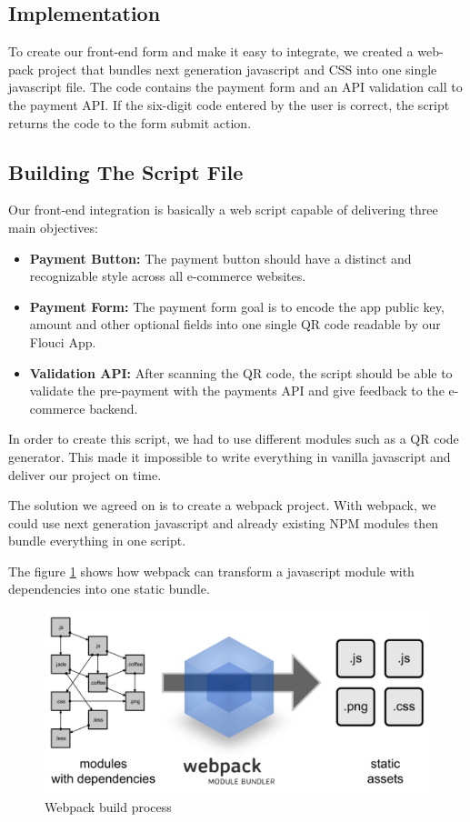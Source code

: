 \begin{spacing}{1.2}
\subsection{Implementation}
To create our front-end form and make it easy to integrate, we created a web-pack project that bundles next generation javascript and CSS into one single javascript file.
The code contains the payment form and an API validation call to the payment API.
If the six-digit code entered by the user is correct, the script returns the code to the form submit action.
\subsection{Building The Script File}
Our front-end integration is basically a web script capable of delivering three main objectives:
\begin{itemize}
	\item \textbf{Payment Button:} The payment button should have a distinct and recognizable style across all e-commerce websites.
	\item \textbf{Payment Form:} The payment form goal is to encode the app public key, amount and other optional fields into one single QR code readable by our Flouci App.
	\item \textbf{Validation API:} After scanning the QR code, the script should be able to validate the pre-payment with the payments API and give feedback to the e-commerce backend.
\end{itemize}

In order to create this script, we had to use different modules such as a QR code generator. This made it impossible to write everything in vanilla javascript and deliver our project on time.


The solution we agreed on is to create a webpack project. With webpack, we could use next generation javascript and already existing NPM modules then bundle everything in one script.

The figure \ref{fig:webpack} shows how webpack can transform a javascript module with dependencies into one static bundle.
\begin{figure}[H]\centering
\includegraphics[width=\textwidth, keepaspectratio ]{webpack.png}
\caption{Webpack build process}
\label{fig:webpack}
\end{figure}


\end{spacing}
